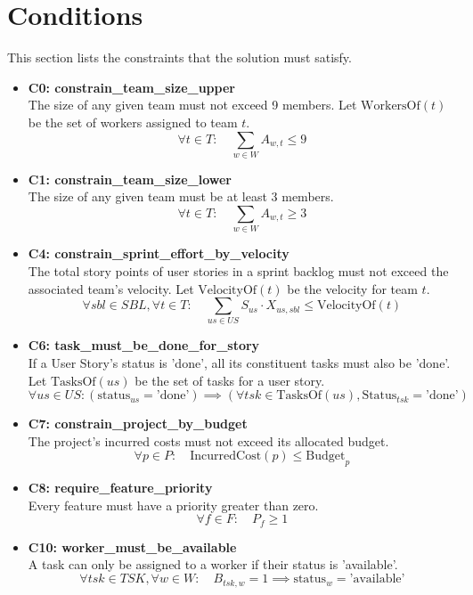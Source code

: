 \documentclass{article}
\begin{document}
\section{Conditions}
\label{sec:conditions}
This section lists the constraints that the solution must satisfy.
\begin{itemize}
    \item \textbf{C0: constrain\_team\_size\_upper}\\
    The size of any given team must not exceed 9 members. Let $\text{WorkersOf}(t)$ be the set of workers assigned to team $t$.
    $$ \forall t \in T: \quad \sum_{w \in W} A_{w, t} \leq 9 $$

    \item \textbf{C1: constrain\_team\_size\_lower}\\
    The size of any given team must be at least 3 members.
    $$ \forall t \in T: \quad \sum_{w \in W} A_{w, t} \geq 3 $$
    
    \item \textbf{C4: constrain\_sprint\_effort\_by\_velocity}\\
    The total story points of user stories in a sprint backlog must not exceed the associated team's velocity. Let $\text{VelocityOf}(t)$ be the velocity for team $t$.
    $$ \forall sbl \in SBL, \forall t \in T: \quad \sum_{us \in US} S_{us} \cdot X_{us, sbl} \leq \text{VelocityOf}(t) $$

    \item \textbf{C6: task\_must\_be\_done\_for\_story}\\
    If a User Story's status is 'done', all its constituent tasks must also be 'done'. Let $\text{TasksOf}(us)$ be the set of tasks for a user story.
    $$ \forall us \in US: (\text{status}_{us} = \text{'done'}) \implies (\forall tsk \in \text{TasksOf}(us), \text{Status}_{tsk} = \text{'done'}) $$
    
    \item \textbf{C7: constrain\_project\_by\_budget}\\
    The project's incurred costs must not exceed its allocated budget.
    $$ \forall p \in P: \quad \text{IncurredCost}(p) \leq \text{Budget}_p $$

    \item \textbf{C8: require\_feature\_priority}\\
    Every feature must have a priority greater than zero.
    $$ \forall f \in F: \quad P_f \geq 1 $$

    \item \textbf{C10: worker\_must\_be\_available}\\
    A task can only be assigned to a worker if their status is 'available'.
    $$ \forall tsk \in TSK, \forall w \in W: \quad B_{tsk, w} = 1 \implies \text{status}_w = \text{'available'} $$

\end{itemize}
\end{document}
